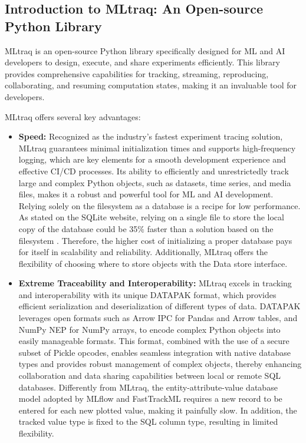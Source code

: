 \subsection{Introduction to MLtraq: An Open-source Python Library}

MLtraq is an open-source Python library specifically designed for ML and AI developers to design, execute, and share experiments efficiently. This library provides comprehensive capabilities for tracking, streaming, reproducing, collaborating, and resuming computation states, making it an invaluable tool for developers. \cite{mltraq2024}

MLtraq offers several key advantages:

\begin{itemize}
    \item \textbf{Speed:} Recognized as the industry's fastest experiment tracing solution, MLtraq guarantees minimal initialization times and supports high-frequency logging, which are key elements for a smooth development experience and effective CI/CD processes. Its ability to efficiently and unrestrictedly track large and complex Python objects, such as datasets, time series, and media files, makes it a robust and powerful tool for ML and AI development. Relying solely on the filesystem as a database is a recipe for low performance. As stated on the SQLite website, relying on a single file to store the local copy of the database could be 35\% faster than a solution based on the filesystem \cite{sqlite2024}. Therefore, the higher cost of initializing a proper database pays for itself in scalability and reliability. Additionally, MLtraq offers the flexibility of choosing where to store objects with the Data store interface.
    
    \item \textbf{Extreme Traceability and Interoperability:} MLtraq excels in tracking and interoperability with its unique DATAPAK format, which provides efficient serialization and deserialization of different types of data. DATAPAK leverages open formats such as Arrow IPC for Pandas and Arrow tables, and NumPy NEP for NumPy arrays, to encode complex Python objects into easily manageable formats. This format, combined with the use of a secure subset of Pickle opcodes, enables seamless integration with native database types and provides robust management of complex objects, thereby enhancing collaboration and data sharing capabilities between local or remote SQL databases. Differently from MLtraq, the entity-attribute-value database model adopted by MLflow and FastTrackML requires a new record to be entered for each new plotted value, making it painfully slow. In addition, the tracked value type is fixed to the SQL column type, resulting in limited flexibility.
    

\end{itemize}
